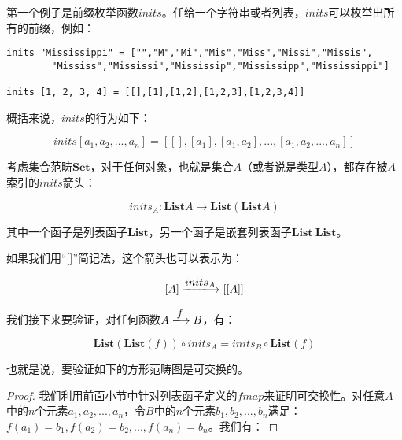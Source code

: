 \documentclass{article}
\begin{document}
\begin{example}
第一个例子是前缀枚举函数$inits$。任给一个字符串或者列表，$inits$可以枚举出所有的前缀，例如：

\lstset{frame=none}
\begin{lstlisting}
inits "Mississippi" = ["","M","Mi","Mis","Miss","Missi","Missis",
        "Mississ","Mississi","Mississip","Mississipp","Mississippi"]

inits [1, 2, 3, 4] = [[],[1],[1,2],[1,2,3],[1,2,3,4]]
\end{lstlisting}

概括来说，$inits$的行为如下：

\[
inits [a_1, a_2, ..., a_n] = [[], [a_1], [a_1, a_2], ..., [a_1, a_2, ..., a_n]]
\]

考虑集合范畴$\pmb{Set}$，对于任何对象，也就是集合$A$（或者说是类型$A$），都存在被$A$索引的$inits$箭头：

\[
inits_A : \mathbf{List} A \to \mathbf{List}(\mathbf{List} A)
\]

其中一个函子是列表函子$\mathbf{List}$，另一个函子是嵌套列表函子$\mathbf{List}\ \mathbf{List}$。

如果我们用“[]”简记法，这个箭头也可以表示为：

\[
[A] \arrowto{inits_A} [[A]]
\]

我们接下来要验证，对任何函数$A \arrowto{f} B$，有：

\[
\mathbf{List}(\mathbf{List}(f)) \circ inits_A = inits_B \circ \mathbf{List}(f)
\]

也就是说，要验证如下的方形范畴图是可交换的。

\begin{center}
\end{center}

\begin{proof}
我们利用前面小节中针对列表函子定义的$fmap$来证明可交换性。对任意$A$中的$n$个元素$a_1, a_2, ..., a_n$，令$B$中的$n$个元素$b_1, b_2, ..., b_n$满足：$f(a_1) = b_1, f(a_2) = b_2, ..., f(a_n) = b_n$。我们有：


\end{proof}
\end{example}
\end{document}
